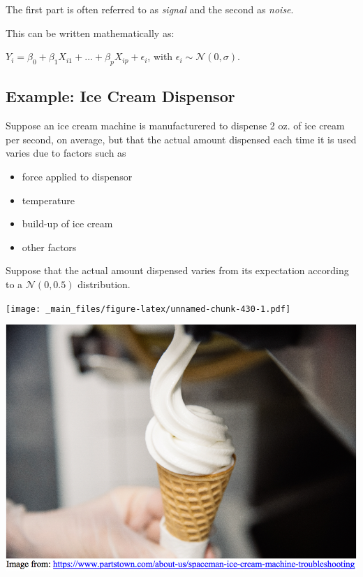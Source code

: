 \documentclass[]{book}
\providecommand{\tightlist}{%
  \setlength{\itemsep}{0pt}\setlength{\parskip}{0pt}}
\begin{document}
The first part is often referred to as \emph{signal} and the second as
\emph{noise}.

This can be written mathematically as:

\(Y_i = \beta_0 + \beta_1X_{i1}+ \ldots + \beta_pX_{ip} + \epsilon_i\),
with \(\epsilon_i\sim\mathcal{N}(0,\sigma)\).

\subsection{Example: Ice Cream
Dispensor}\label{example-ice-cream-dispensor}

Suppose an ice cream machine is manufacturered to dispense 2 oz. of ice
cream per second, on average, but that the actual amount dispensed each
time it is used varies due to factors such as

\begin{itemize}
\tightlist
\item
  force applied to dispensor\\
\item
  temperature\\
\item
  build-up of ice cream\\
\item
  other factors
\end{itemize}

Suppose that the actual amount dispensed varies from its expectation
according to a \(\mathcal{N}(0,0.5)\) distribution.

\texttt{[image: \_main\_files/figure-latex/unnamed-chunk-430-1.pdf]}

\includegraphics[width=1\linewidth]{Ice_Cream}
\end{document}
